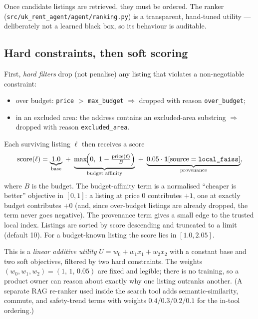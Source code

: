 \documentclass[11pt,a4paper]{article}
\newcommand{\code}[1]{\texttt{\small #1}}
\begin{document}
Once candidate listings are retrieved, they must be ordered. The ranker
(\code{src/\allowbreak uk\_rent\_agent/\allowbreak agent/ranking.py}) is a transparent, hand-tuned utility ---
deliberately not a learned black box, so its behaviour is auditable.

\subsection{Hard constraints, then soft scoring}
First, \emph{hard filters} drop (not penalise) any listing that violates a
non-negotiable constraint:
\begin{itemize}[leftmargin=1.4em,itemsep=1pt]
  \item over budget: \code{price} $> $ \code{max\_budget} $\Rightarrow$ dropped with
        reason \code{over\_budget};
  \item in an excluded area: the address contains an excluded-area substring
        $\Rightarrow$ dropped with reason \code{excluded\_area}.
\end{itemize}

Each surviving listing $\ell$ then receives a score
\[
  \mathrm{score}(\ell) = \underbrace{1.0}_{\text{base}}
  \;+\; \underbrace{\max\!\Bigl(0,\ 1 - \tfrac{\mathrm{price}(\ell)}{B}\Bigr)}_{\text{budget affinity}}
  \;+\; \underbrace{0.05\cdot\mathbf{1}[\text{source}=\texttt{local\_faiss}]}_{\text{provenance}},
\]
where $B$ is the budget. The budget-affinity term is a normalised ``cheaper is
better'' objective in $[0,1]$: a listing at price $0$ contributes $+1$, one at exactly
budget contributes $+0$ (and, since over-budget listings are already dropped, the term
never goes negative). The provenance term gives a small edge to the trusted local
index. Listings are sorted by score descending and truncated to a limit (default 10).
For a budget-known listing the score lies in $[1.0, 2.05]$.

\begin{intuition}
This is a \emph{linear additive utility} $U = w_0 + w_1 x_1 + w_2 x_2$ with a constant
base and two soft objectives, filtered by two hard constraints. The weights
$(w_0,w_1,w_2)=(1,\,1,\,0.05)$ are fixed and legible; there is no training, so a
product owner can reason about exactly why one listing outranks another. (A separate
RAG re-ranker used inside the search tool adds semantic-similarity, commute, and
safety-trend terms with weights $0.4/0.3/0.2/0.1$ for the in-tool ordering.)
\end{intuition}
\end{document}

